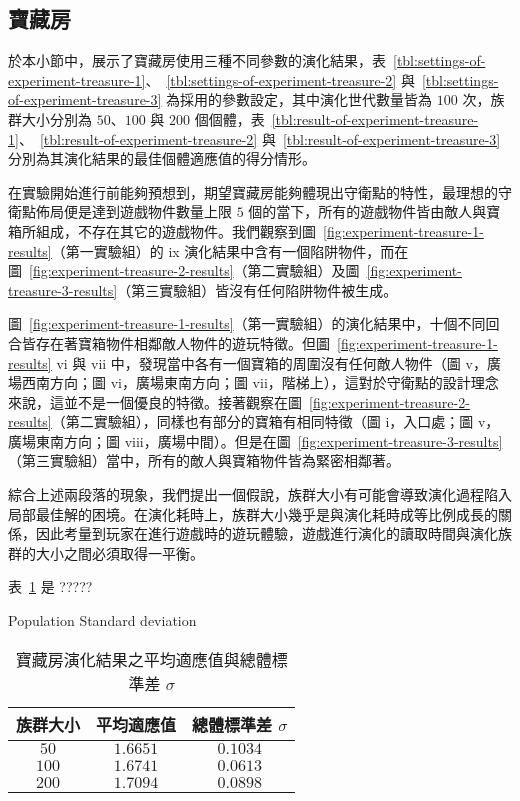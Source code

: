 \subsection{寶藏房}
\label{ssec:experiment-results-treasure}

於本小節中，展示了寶藏房使用三種不同參數的演化結果，表~\ref{tbl:settings-of-experiment-treasure-1}、~\ref{tbl:settings-of-experiment-treasure-2} 與~\ref{tbl:settings-of-experiment-treasure-3} 為採用的參數設定，其中演化世代數量皆為 $100$ 次，族群大小分別為 $50$、$100$ 與 $200$ 個個體，表~\ref{tbl:result-of-experiment-treasure-1}、~\ref{tbl:result-of-experiment-treasure-2} 與~\ref{tbl:result-of-experiment-treasure-3} 分別為其演化結果的最佳個體適應值的得分情形。

在實驗開始進行前能夠預想到，期望寶藏房能夠體現出守衛點的特性，最理想的守衛點佈局便是達到遊戲物件數量上限 $5$ 個的當下，所有的遊戲物件皆由敵人與寶箱所組成，不存在其它的遊戲物件。我們觀察到圖~\ref{fig:experiment-treasure-1-results}（第一實驗組）的 ix 演化結果中含有一個陷阱物件，而在圖~\ref{fig:experiment-treasure-2-results}（第二實驗組）及圖~\ref{fig:experiment-treasure-3-results}（第三實驗組）皆沒有任何陷阱物件被生成。

圖~\ref{fig:experiment-treasure-1-results}（第一實驗組）的演化結果中，十個不同回合皆存在著寶箱物件相鄰敵人物件的遊玩特徵。但圖~\ref{fig:experiment-treasure-1-results} vi 與 vii 中，發現當中各有一個寶箱的周圍沒有任何敵人物件（圖 v，廣場西南方向；圖 vi，廣場東南方向；圖 vii，階梯上），這對於守衛點的設計理念來說，這並不是一個優良的特徵。接著觀察在圖~\ref{fig:experiment-treasure-2-results}（第二實驗組），同樣也有部分的寶箱有相同特徵（圖 i，入口處；圖 v，廣場東南方向；圖 viii，廣場中間）。但是在圖~\ref{fig:experiment-treasure-3-results} （第三實驗組）當中，所有的敵人與寶箱物件皆為緊密相鄰著。

綜合上述兩段落的現象，我們提出一個假說，族群大小有可能會導致演化過程陷入局部最佳解的困境。在演化耗時上，族群大小幾乎是與演化耗時成等比例成長的關係，因此考量到玩家在進行遊戲時的遊玩體驗，遊戲進行演化的讀取時間與演化族群的大小之間必須取得一平衡。

表~\ref{tbl:result-of-experiment-treasure-avg-sd} 是 ?????

Population Standard deviation

\begin{table}[H]
  \centering
  \caption{寶藏房演化結果之平均適應值與總體標準差 $\sigma$}
  \label{tbl:result-of-experiment-treasure-avg-sd}
  \bigskip
  \vspace{-5mm}
  \begin{tabular}[t]{ | c | c | c | }
    \hline
    族群大小 & 平均適應值 & 總體標準差 $\sigma$ \\\hline
    $50$  & $1.6651$ & $0.1034$ \\\hline
    $100$ & $1.6741$ & $0.0613$ \\\hline
    $200$ & $1.7094$ & $0.0898$ \\\hline
  \end{tabular}
\end{table}

